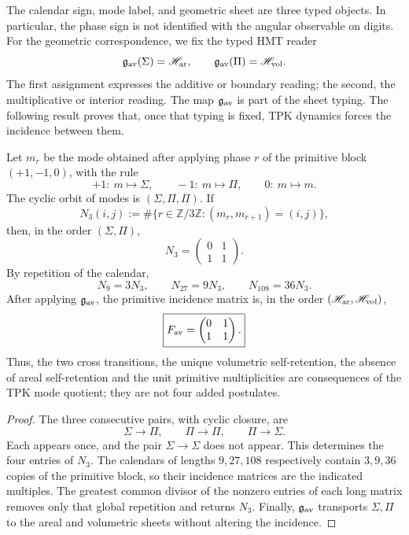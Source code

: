 The calendar sign, mode label, and geometric sheet are three typed
objects. In particular, the phase sign is not identified with the
angular observable on digits. For the geometric correspondence, we fix the
typed HMT reader
\[
 \mathfrak g_{\rm av}(\Sigma)=\mathscr H_{\rm ar},
 \qquad
 \mathfrak g_{\rm av}(\Pi)=\mathscr H_{\rm vol}.
\]
The first assignment expresses the additive or boundary reading; the second, the
multiplicative or interior reading. The map \(\mathfrak g_{\rm av}\) is
part of the sheet typing. The following result proves that, once
that typing is fixed, TPK dynamics forces the incidence between them.

\begin{theorem}
\label{p12-83-c16-s2:thm:descenso-necesario-fav}
Let \(m_r\) be the mode obtained after applying phase \(r\) of the
primitive block \((+1,-1,0)\), with the rule
\[
 +1:\ m\mapsto\Sigma,\qquad
 -1:\ m\mapsto\Pi,\qquad
 0:\ m\mapsto m.
\]
The cyclic orbit of modes is \((\Sigma,\Pi,\Pi)\). If
\[
 N_3(i,j)
 :=
 \#\{r\in\mathbb Z/3\mathbb Z:(m_r,m_{r+1})=(i,j)\},
\]
then, in the order \((\Sigma,\Pi)\),
\[
 \boxed{
 N_3=
 \begin{pmatrix}0&1\\1&1\end{pmatrix}.}
\]
By repetition of the calendar,
\[
 N_9=3N_3,\qquad N_{27}=9N_3,\qquad N_{108}=36N_3.
\]
After applying \(\mathfrak g_{\rm av}\), the primitive incidence
matrix is, in the order
\((\mathscr H_{\rm ar},\mathscr H_{\rm vol})\),
\[
 \boxed{
 F_{\rm av}=
 \begin{pmatrix}0&1\\1&1\end{pmatrix}.}
\]
Thus, the two cross transitions, the unique volumetric self-retention, the
absence of areal self-retention and the unit primitive multiplicities
are consequences of the TPK mode quotient; they are not four added
postulates.
\end{theorem}

\begin{proof}
The three consecutive pairs, with cyclic closure, are
\[
 \Sigma\longrightarrow\Pi,\qquad
 \Pi\longrightarrow\Pi,\qquad
 \Pi\longrightarrow\Sigma.
\]
Each appears once, and the pair \(\Sigma\to\Sigma\) does not appear. This determines the four entries of \(N_3\). The calendars of lengths \(9,27,108\) respectively contain \(3,9,36\) copies of the primitive block, so their incidence matrices are the indicated multiples. The greatest common divisor of the nonzero entries of each long matrix removes only that global repetition and returns \(N_3\). Finally, \(\mathfrak g_{\rm av}\) transports \(\Sigma,\Pi\) to the areal and volumetric sheets without altering the incidence.
\end{proof}

